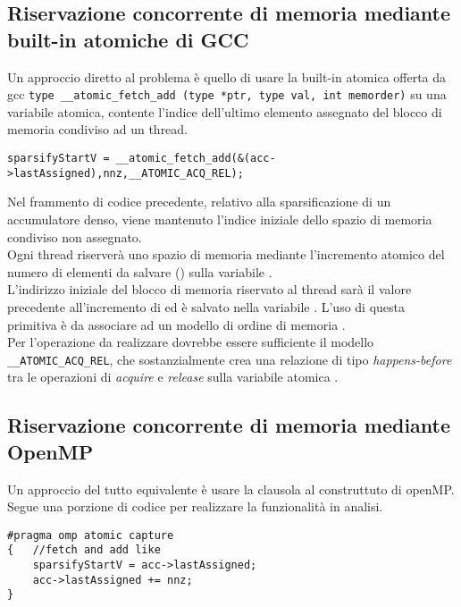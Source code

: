 \subsection[Uso built-in atomiche di GCC]
{Riservazione concorrente di memoria mediante built-in atomiche di GCC}
Un approccio diretto al problema è quello di usare la built-in atomica offerta da gcc
\verb|type __atomic_fetch_add (type *ptr, type val, int memorder)|
su una variabile atomica, contente l'indice dell'ultimo elemento assegnato del blocco di memoria condiviso ad un thread.\\
\begin{lstlisting}
sparsifyStartV = __atomic_fetch_add(&(acc->lastAssigned),nnz,__ATOMIC_ACQ_REL); 
\end{lstlisting}
Nel frammento di codice precedente, relativo alla sparsificazione di un accumulatore denso,
viene mantenuto l'indice iniziale dello spazio di memoria condiviso non assegnato.\\
Ogni thread riserverà uno spazio di memoria mediante l'incremento atomico 
del numero di elementi da salvare () sulla variabile .\\
L'indirizzo iniziale del blocco di memoria riservato al thread sarà il valore precedente all'incremento
di  ed è salvato nella variabile .
\voidLine
L'uso di questa primitiva è da associare ad un modello di ordine di memoria .\\
Per l'operazione da realizzare dovrebbe essere sufficiente il modello \\ \verb|__ATOMIC_ACQ_REL|,
che sostanzialmente crea una relazione di tipo \emph{happens-before} tra le operazioni di 
\emph{acquire} e \emph{release} sulla variabile atomica  {\bf \cite{isoc11,gcc10.1}}.\\

\subsection[Uso clausola \vvv{capture} di OpenMP]
{Riservazione concorrente di memoria mediante OpenMP}
Un approccio del tutto equivalente è usare la clausola  al construttuto  di openMP.\\
Segue una porzione di codice per realizzare la funzionalità in analisi.
\begin{lstlisting}
#pragma omp atomic capture
{   //fetch and add like 
    sparsifyStartV = acc->lastAssigned;
    acc->lastAssigned += nnz;
}
\end{lstlisting}

